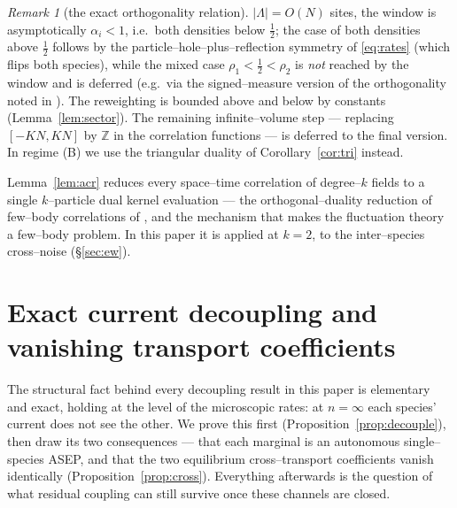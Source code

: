 \documentclass[11pt]{article}
\theoremstyle{plain}
\theoremstyle{definition}
\theoremstyle{remark}
\newtheorem{remark}[theorem]{Remark}
\newcommand{\Z}{\mathbb{Z}}\newcommand{\R}{\mathbb{R}}\newcommand{\N}{\mathbb{N}}
\begin{document}
\begin{remark}[the exact orthogonality relation]
$|\Lambda|=O(N)$ sites, the window is asymptotically $\alpha_i<1$, i.e.\ both
densities below $\tfrac12$; the case of both densities above $\tfrac12$ follows by
the particle--hole--plus--reflection symmetry of \eqref{eq:rates} (which flips both
species), while the mixed case $\rho_1<\tfrac12<\rho_2$ is \emph{not} reached by the
window and is deferred (e.g.\ via the signed--measure version of the orthogonality
noted in \cite[Rmk.\ after Thm.~3.2]{CFG20}). The reweighting
is bounded above and below by constants (Lemma~\ref{lem:sector}). The remaining
infinite--volume step --- replacing $[-KN,KN]$ by $\Z$ in the correlation functions
--- is deferred to the final version. In regime (B) we use the triangular duality
of Corollary~\ref{cor:tri} instead.
\end{remark}

\noindent Lemma~\ref{lem:acr} reduces every space--time correlation of degree--$k$
fields to a single $k$--particle dual kernel evaluation --- the orthogonal--duality
reduction of few--body correlations of \cite{ACR,ACR2}, and the mechanism that makes the
fluctuation theory a few--body problem. In this paper it is applied at $k=2$, to the
inter--species cross--noise (\S\ref{sec:ew}).

\section{Exact current decoupling and vanishing transport coefficients}\label{sec:decouple}

The structural fact behind every decoupling result in this paper is elementary and
exact, holding at the level of the microscopic rates: at $n=\infty$ each species'
current does not see the other. We prove this first (Proposition~\ref{prop:decouple}),
then draw its two consequences --- that each marginal is an autonomous single--species
ASEP, and that the two equilibrium cross--transport coefficients vanish identically
(Proposition~\ref{prop:cross}). Everything afterwards is the question of what residual
coupling can still survive once these channels are closed.
\end{document}
